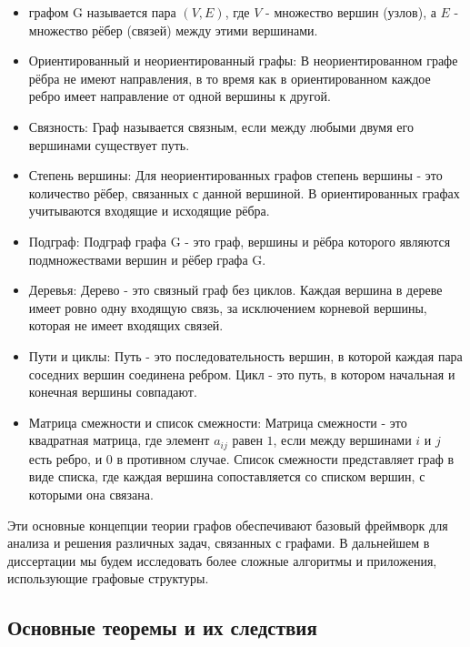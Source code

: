 \begin{itemize}
	\item графом G называется пара $(V,E)$, где $V$ - множество вершин (узлов), а $E$ - множество рёбер (связей) между этими вершинами.
	\item Ориентированный и неориентированный графы: В неориентированном графе рёбра не имеют направления, в то время как в ориентированном каждое ребро имеет направление от одной вершины к другой.
	\item Связность: Граф называется связным, если между любыми двумя его вершинами существует путь.
	\item Степень вершины: Для неориентированных графов степень вершины - это количество рёбер, связанных с данной вершиной. В ориентированных графах учитываются входящие и исходящие рёбра.
	\item Подграф: Подграф графа G - это граф, вершины и рёбра которого являются подмножествами вершин и рёбер графа G.
	\item Деревья: Дерево - это связный граф без циклов. Каждая вершина в дереве имеет ровно одну входящую связь, за исключением корневой вершины, которая не имеет входящих связей.
	\item Пути и циклы: Путь - это последовательность вершин, в которой каждая пара соседних вершин соединена ребром. Цикл - это путь, в котором начальная и конечная вершины совпадают.
	\item Матрица смежности и список смежности: Матрица смежности - это квадратная матрица, где элемент $a_{ij}$ равен $1$, если между вершинами $i$ и $j$ есть ребро, и $0$ в противном случае. Список смежности представляет граф в виде списка, где каждая вершина сопоставляется со списком вершин, с которыми она связана.
\end{itemize}

Эти основные концепции теории графов обеспечивают базовый фреймворк для анализа и решения различных задач, связанных с графами. В дальнейшем в диссертации мы будем исследовать более сложные алгоритмы и приложения, использующие графовые структуры.


\subsection{Основные теоремы и их следствия}

